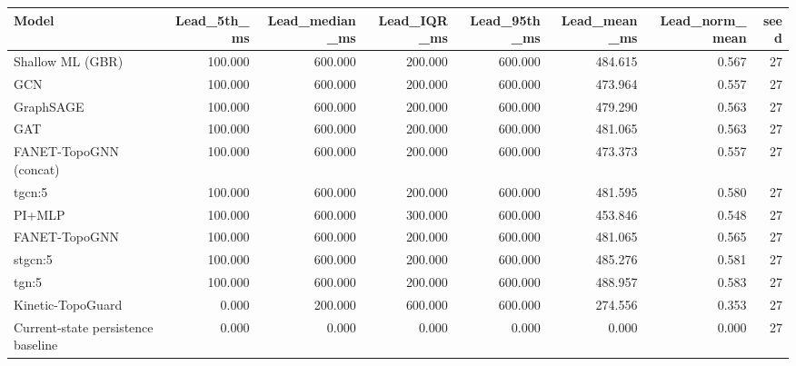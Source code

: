\begin{tabular}{lrrrrrrr}
\toprule
Model & Lead\_5th\_ms & Lead\_median\_ms & Lead\_IQR\_ms & Lead\_95th\_ms & Lead\_mean\_ms & Lead\_norm\_mean & seed \\
\midrule
Shallow ML (GBR) & 100.000 & 600.000 & 200.000 & 600.000 & 484.615 & 0.567 & 27 \\
GCN & 100.000 & 600.000 & 200.000 & 600.000 & 473.964 & 0.557 & 27 \\
GraphSAGE & 100.000 & 600.000 & 200.000 & 600.000 & 479.290 & 0.563 & 27 \\
GAT & 100.000 & 600.000 & 200.000 & 600.000 & 481.065 & 0.563 & 27 \\
FANET-TopoGNN (concat) & 100.000 & 600.000 & 200.000 & 600.000 & 473.373 & 0.557 & 27 \\
tgcn:5 & 100.000 & 600.000 & 200.000 & 600.000 & 481.595 & 0.580 & 27 \\
PI+MLP & 100.000 & 600.000 & 300.000 & 600.000 & 453.846 & 0.548 & 27 \\
FANET-TopoGNN & 100.000 & 600.000 & 200.000 & 600.000 & 481.065 & 0.565 & 27 \\
stgcn:5 & 100.000 & 600.000 & 200.000 & 600.000 & 485.276 & 0.581 & 27 \\
tgn:5 & 100.000 & 600.000 & 200.000 & 600.000 & 488.957 & 0.583 & 27 \\
Kinetic-TopoGuard & 0.000 & 200.000 & 600.000 & 600.000 & 274.556 & 0.353 & 27 \\
Current-state persistence baseline & 0.000 & 0.000 & 0.000 & 0.000 & 0.000 & 0.000 & 27 \\
\bottomrule
\end{tabular}